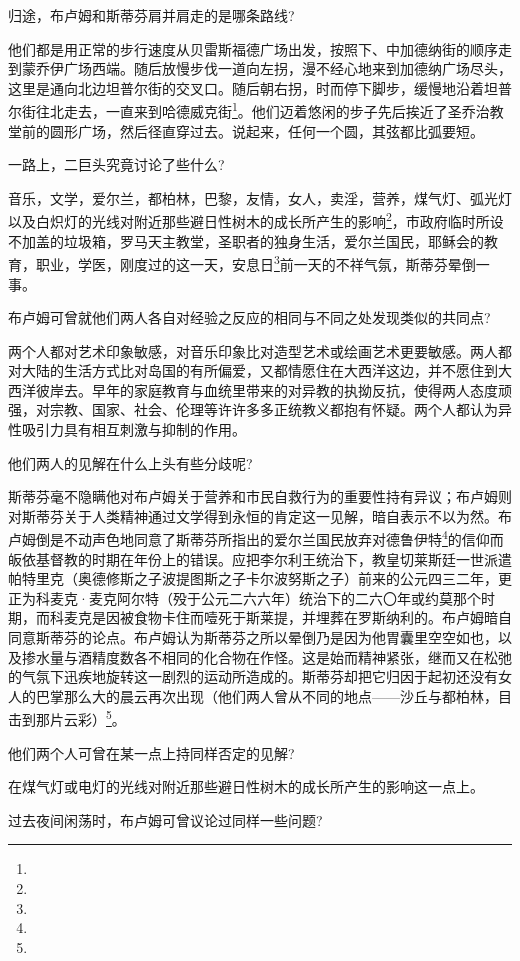 \par 归途，布卢姆和斯蒂芬肩并肩走的是哪条路线?
\par 他们都是用正常的步行速度从贝雷斯福德广场出发，按照下、中加德纳街的顺序走到蒙乔伊广场西端。随后放慢步伐一道向左拐，漫不经心地来到加德纳广场尽头，这里是通向北边坦普尔街的交叉口。随后朝右拐，时而停下脚步，缓慢地沿着坦普尔街往北走去，一直来到哈德威克街\footnote{}。他们迈着悠闲的步子先后挨近了圣乔治教堂前的圆形广场，然后径直穿过去。说起来，任何一个圆，其弦都比弧要短。
\par 一路上，二巨头究竟讨论了些什么?
\par 音乐，文学，爱尔兰，都柏林，巴黎，友情，女人，卖淫，营养，煤气灯、弧光灯以及白炽灯的光线对附近那些避日性树木的成长所产生的影响\footnote{}，市政府临时所设不加盖的垃圾箱，罗马天主教堂，圣职者的独身生活，爱尔兰国民，耶稣会的教育，职业，学医，刚度过的这一天，安息日\footnote{}前一天的不祥气氛，斯蒂芬晕倒一事。
\par 布卢姆可曾就他们两人各自对经验之反应的相同与不同之处发现类似的共同点?
\par 两个人都对艺术印象敏感，对音乐印象比对造型艺术或绘画艺术更要敏感。两人都对大陆的生活方式比对岛国的有所偏爱，又都情愿住在大西洋这边，并不愿住到大西洋彼岸去。早年的家庭教育与血统里带来的对异教的执拗反抗，使得两人态度顽强，对宗教、国家、社会、伦理等许许多多正统教义都抱有怀疑。两个人都认为异性吸引力具有相互刺激与抑制的作用。
\par 他们两人的见解在什么上头有些分歧呢?
\par 斯蒂芬毫不隐瞒他对布卢姆关于营养和市民自救行为的重要性持有异议；布卢姆则对斯蒂芬关于人类精神通过文学得到永恒的肯定这一见解，暗自表示不以为然。布卢姆倒是不动声色地同意了斯蒂芬所指出的爱尔兰国民放弃对德鲁伊特\footnote{}的信仰而皈依基督教的时期在年份上的错误。应把李尔利王统治下，教皇切莱斯廷一世派遣帕特里克（奥德修斯之子波提图斯之子卡尔波努斯之子）前来的公元四三二年，更正为科麦克·麦克阿尔特（殁于公元二六六年）统治下的二六〇年或约莫那个时期，而科麦克是因被食物卡住而噎死于斯莱提，并埋葬在罗斯纳利的。布卢姆暗自同意斯蒂芬的论点。布卢姆认为斯蒂芬之所以晕倒乃是因为他胃囊里空空如也，以及掺水量与酒精度数各不相同的化合物在作怪。这是始而精神紧张，继而又在松弛的气氛下迅疾地旋转这一剧烈的运动所造成的。斯蒂芬却把它归因于起初还没有女人的巴掌那么大的晨云再次出现（他们两人曾从不同的地点——沙丘与都柏林，目击到那片云彩）\footnote{}。
\par 他们两个人可曾在某一点上持同样否定的见解?
\par 在煤气灯或电灯的光线对附近那些避日性树木的成长所产生的影响这一点上。
\par 过去夜间闲荡时，布卢姆可曾议论过同样一些问题?
